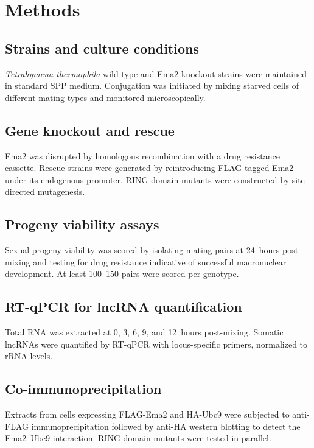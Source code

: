 \documentclass[11pt]{article}
\begin{document}
\section{Methods}

\subsection{Strains and culture conditions}

\textit{Tetrahymena thermophila} wild-type and Ema2 knockout strains were maintained in standard SPP medium. Conjugation was initiated by mixing starved cells of different mating types and monitored microscopically.

\subsection{Gene knockout and rescue}

Ema2 was disrupted by homologous recombination with a drug resistance cassette. Rescue strains were generated by reintroducing FLAG-tagged Ema2 under its endogenous promoter. RING domain mutants were constructed by site-directed mutagenesis.

\subsection{Progeny viability assays}

Sexual progeny viability was scored by isolating mating pairs at 24~hours post-mixing and testing for drug resistance indicative of successful macronuclear development. At least 100--150 pairs were scored per genotype.

\subsection{RT-qPCR for lncRNA quantification}

Total RNA was extracted at 0, 3, 6, 9, and 12~hours post-mixing. Somatic lncRNAs were quantified by RT-qPCR with locus-specific primers, normalized to rRNA levels.

\subsection{Co-immunoprecipitation}

Extracts from cells expressing FLAG-Ema2 and HA-Ubc9 were subjected to anti-FLAG immunoprecipitation followed by anti-HA western blotting to detect the Ema2--Ubc9 interaction. RING domain mutants were tested in parallel.
\end{document}
